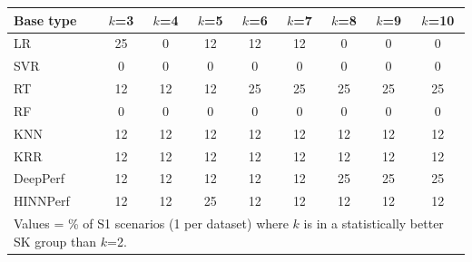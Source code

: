 \begin{tabular}{lcccccccc}
\toprule
Base type & $k$=3 & $k$=4 & $k$=5 & $k$=6 & $k$=7 & $k$=8 & $k$=9 & $k$=10 \\
\midrule
LR & 25 & 0 & 12 & 12 & 12 & 0 & 0 & 0 \\
SVR & 0 & 0 & 0 & 0 & 0 & 0 & 0 & 0 \\
RT & 12 & 12 & 12 & 25 & 25 & 25 & 25 & 25 \\
RF & 0 & 0 & 0 & 0 & 0 & 0 & 0 & 0 \\
KNN & 12 & 12 & 12 & 12 & 12 & 12 & 12 & 12 \\
KRR & 12 & 12 & 12 & 12 & 12 & 12 & 12 & 12 \\
DeepPerf & 12 & 12 & 12 & 12 & 12 & 25 & 25 & 25 \\
HINNPerf & 12 & 12 & 25 & 12 & 12 & 12 & 12 & 12 \\
\bottomrule
\multicolumn{9}{l}{\footnotesize Values = \% of S1 scenarios (1 per dataset) where $k$ is in a statistically better SK group than $k$=2.}} \\
\end{tabular}
